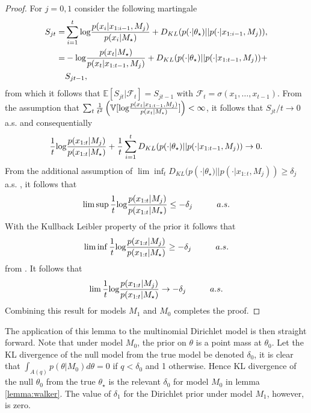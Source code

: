 \documentclass[11pt]{article}
\def\log{{\rm log}}
\begin{document}
\begin{proof}
  For $j=0,1$ consider the following martingale
  \begin{align*}
    \label{eq:walker_martingale}
    S_{jt} =& \sum_{i=1}^{t} \log \frac{p(x_i|x_{1:i-1},M_j)}{p(x_i|M_\star)} + D_{KL}(p(\cdot|\theta_\star)||p(\cdot|x_{1:i-1}, M_j) ),\\
    =& -\log \frac{p(x_t|M_\star)}{p(x_t|x_{1:t-1},M_j)} + D_{KL}(p(\cdot|\theta_\star)||p(\cdot|x_{1:t-1}, M_j) ) +\\
    &S_{jt-1},\\
  \end{align*}
  from which it follows that $\mathbb{E}[S_{jt}|\mathcal{F}_t] = S_{jt-1}$ with $\mathcal{F}_t = \sigma(x_1,\dots,x_{t-1})$. From the assumption that  $\sum_t \frac{1}{t^2} \left( \mathbb{V}[\log \frac{p(x_t|x_{1:t-1},M_j)}{p(x_t|M_\star )}]\right) < \infty$, it follows that $S_{jt}/t \rightarrow 0$ a.s. and consequentially
  \begin{align*}
    \frac{1}{t} \log \frac{p(x_{1:t}|M_j)}{p(x_{1:t}|M_\star)} + \frac{1}{t}\sum_{i=1}^t  D_{KL}(p(\cdot|\theta_\star)||p(\cdot|x_{1:t-1}, M_j) )\rightarrow 0.
  \end{align*}
  From the additional assumption of $\lim \inf_t D_{KL}(p(\cdot|\theta_\star)||p(\cdot|x_{1:t}, M_j) ) \geq \delta_j$ a.s. , it follows that
  \begin{align*}
    \lim \sup   \frac{1}{t} \log \frac{p(x_{1:t}|M_j)}{p(x_{1:t}|M_\star)} \leq - \delta_j \hspace{1cm} a.s.
  \end{align*}
  With the Kullback Leibler property of the prior it follows that
  \begin{align*}
     \lim \inf   \frac{1}{t} \log \frac{p(x_{1:t}|M_j)}{p(x_{1:t}|M_\star)} \geq - \delta_j \hspace{1cm} a.s.
  \end{align*}
  from \cite{barron}. It follows that
    \begin{align*}
     \lim   \frac{1}{t} \log \frac{p(x_{1:t}|M_j)}{p(x_{1:t}|M_\star)} \rightarrow - \delta_j \hspace{1cm} a.s.
    \end{align*}
    Combining this result for models $M_1$ and $M_0$ completes the proof.
\end{proof}

The application of this lemma to the multinomial Dirichlet model is then straight forward. Note that under model $M_0$, the prior on $\theta$ is a point mass at $\theta_0$. Let the KL divergence of the null model from the true model be denoted $\delta_0$, it is clear that $\int_{A(q)} p(\theta|M_0) d\theta = 0$ if $q<\delta_0$ and 1 otherwise. Hence KL divergence of the null $\theta_0$ from the true $\theta_\star$ is the relevant $\delta_0$ for model $M_0$ in lemma \ref{lemma:walker}. The value of $\delta_1$ for the Dirichlet prior under model $M_1$, however, is zero. 
\end{document}
